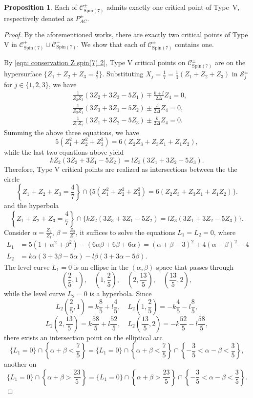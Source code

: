 \documentclass[11pt,letterpaper]{amsart}
\theoremstyle{definition}
\newtheorem{proposition}[theorem]{Proposition}
\numberwithin{equation}{section}
\newcommand{\spin}{\mathrm{Spin}}
\begin{document}
\begin{proposition}
\label{prop: spin7_cone_chirality}
Each of $\mathcal{C}_{\spin(7)}^\pm$ admits exactly one critical point of Type~V, respectively denoted as $P_{AC}^\pm$. 
\end{proposition}
\begin{proof}
By the aforementioned works, there are exactly two critical points of Type V in $\mathcal{C}_{\spin(7)}^+\cup \mathcal{C}_{\spin(7)}^-$. We show that each of $\mathcal{C}_{\spin(7)}^\pm$ contains one.

By \eqref{eqn: conservation Z spin(7) 2}, Type V critical points on $\mathcal{C}_{\spin(7)}^\pm$ are on the hypersurface $\{Z_1+Z_2+Z_3=\frac{4}{7}\}$. Substituting $X_j=\frac{1}{7}=\frac{1}{4}(Z_1+Z_2+Z_3)$ in $\mathcal{S}_j^\pm$ for $j\in \{1,2,3\}$, we have 
\begin{equation}
\begin{split}
&\frac{1}{Z_2Z_3}(3Z_2+3Z_3-5Z_1)\mp \frac{k+l}{2\Delta}Z_4=0,\\
&\frac{1}{Z_3Z_1}(3Z_3+3Z_1-5Z_2)\pm \frac{l}{2\Delta}Z_4=0,\\
&\frac{1}{Z_1Z_2}(3Z_1+3Z_2-5Z_3)\pm\frac{k}{2\Delta}Z_4=0.
\end{split}
\end{equation}
Summing the above three equations, we have 
$$5(Z_1^2+Z_2^2+Z_3^2)=6(Z_2Z_3+Z_3Z_1+Z_1Z_2),$$ while the last two equations above yield
$$
kZ_2(3Z_3+3Z_1-5Z_2)=lZ_3(3Z_1+3Z_2-5Z_3).
$$
Therefore, Type V critical points are realized as intersections between the the circle 
$$\left\{Z_1+Z_2+Z_3=\frac{4}{7}\right\}\cap \{5(Z_1^2+Z_2^2+Z_3^2)=6(Z_2Z_3+Z_3Z_1+Z_1Z_2)\}.$$
and the hyperbola
$$\left\{Z_1+Z_2+Z_3=\frac{4}{7}\right\}\cap \{kZ_2(3Z_3+3Z_1-5Z_2)=lZ_3(3Z_1+3Z_2-5Z_3)\}.$$
Consider $\alpha=\frac{Z_2}{Z_1}$, $\beta=\frac{Z_3}{Z_1}$, it suffices to solve the equations $L_1=L_2=0$, where
\begin{equation}
\begin{split}
L_1&=5(1+\alpha^2+\beta^2)-(6\alpha\beta+6\beta+6\alpha)=(\alpha+\beta-3)^2+4(\alpha-\beta)^2-4\\
L_2&=k\alpha(3+3\beta-5\alpha)-l\beta(3+3\alpha-5\beta).
\end{split}
\end{equation}
The level curve $L_1=0$ is an ellipse in the $(\alpha,\beta)$-space that passes through
$$
\left(\frac{2}{5},1\right),\quad \left(1,\frac{2}{5}\right),\quad \left(2,\frac{13}{5}\right),\quad \left(\frac{13}{5},2\right),
$$
while the level curve $L_2=0$ is a hyperbola. Since 
$$
L_2\left(\frac{2}{5},1\right)=k\frac{8}{5}+l\frac{4}{5},\quad L_2\left(1,\frac{2}{5}\right)=-k\frac{4}{5}-l\frac{8}{5},$$
$$L_2\left(2,\frac{13}{5}\right)=k\frac{58}{5}+l\frac{52}{5},\quad L_2\left(\frac{13}{5},2\right)=-k\frac{52}{5}-l\frac{58}{5},
$$
there exists an intersection point on the elliptical arc
$$\{L_1=0\}\cap \left\{\alpha+\beta<\frac{7}{5}\right\}=\{L_1=0\}\cap \left\{\alpha+\beta<\frac{7}{5}\right\}\cap \left\{-\frac{3}{5}<\alpha-\beta<\frac{3}{5}\right\},$$
another on 
$$\{L_1=0\}\cap \left\{\alpha+\beta>\frac{23}{5}\right\}=\{L_1=0\}\cap \left\{\alpha+\beta>\frac{23}{5}\right\}\cap \left\{-\frac{3}{5}<\alpha-\beta<\frac{3}{5}\right\}.$$


\end{proof}
\end{document}
